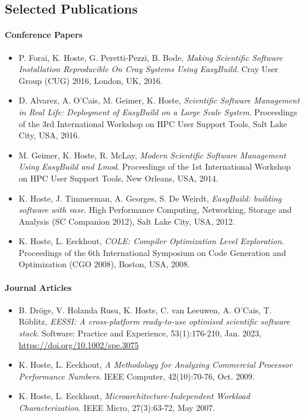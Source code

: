 \subsection*{Selected Publications}

\paragraph{Conference Papers}

\begin{itemize}

\item[] P. Forai, K. Hoste, G. Peretti-Pezzi, B. Bode, \emph{Making Scientific Software Installation Reproducible On Cray Systems Using EasyBuild}. Cray User Group (CUG) 2016, London, UK, 2016.

\item[] D. Alvarez, A. O'Cais, M. Geimer, K. Hoste, \emph{Scientific Software Management in Real Life: Deployment of EasyBuild on a Large Scale System}. Proceedings of the 3rd International Workshop on HPC User Support Tools, Salt Lake City, USA, 2016.

\item[] M. Geimer, K. Hoste, R. McLay,
\emph{Modern Scientific Software Management Using EasyBuild and Lmod}. 
Proceedings of the 1st International Workshop on HPC User Support Tools, New Orleans, USA, 2014.

\item[] K. Hoste, J. Timmerman, A. Georges, S. De Weirdt, \emph{EasyBuild: building software with ease}. High Performance Computing, Networking, Storage and Analysis (SC Companion 2012), Salt Lake City, USA, 2012.

\item[] K. Hoste, L. Eeckhout, \emph{COLE: Compiler Optimization Level Exploration}. Proceedings of the 6th International Symposium on Code Generation and Optimization (CGO 2008), Boston, USA, 2008.


\end{itemize}

\paragraph{Journal Articles}

\begin{itemize}

\item[] B. Dröge, V. Holanda Rusu, K. Hoste, C. van Leeuwen, A. O'Cais, T. Röblitz, \emph{{EESSI}: {A cross‐platform
    ready‐to‐use optimised scientific software stack}}. Software: Practice and Experience, 53(1):176-210, Jan. 2023,
    \url{https://doi.org/10.1002/spe.3075}

\item[] K. Hoste, L. Eeckhout, \emph{A Methodology for Analyzing Commercial Processor Performance Numbers}. IEEE Computer, 42(10):70-76, Oct. 2009.

\item[] K. Hoste, L. Eeckhout, \emph{Microarchitecture-Independent Workload Characterization}. IEEE Micro, 27(3):63-72, May 2007.

\end{itemize}
